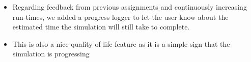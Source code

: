 \documentclass{article}
\begin{document}
    \begin{itemize}
        \item Regarding feedback from previous assignments and continuously increasing run-times, we added a progress logger to let the user know about the estimated time the simulation will still take to complete.
        \item This is also a nice quality of life feature as it is a simple sign that the simulation is progressing
    \end{itemize}
\end{document}
